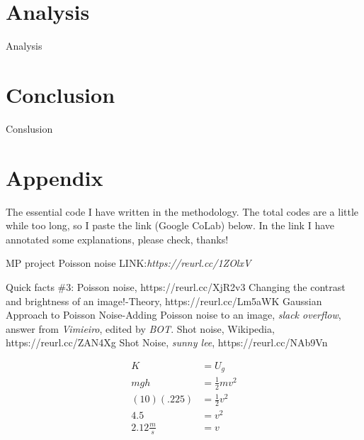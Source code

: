\documentclass[12 pt]{article}
\begin{document}


\section{Analysis}

Analysis

\section{Conclusion}

Conslusion

\section*{Appendix}
The essential code I have written in the methodology. The total codes are a little while too long, so I paste the link (Google CoLab) below. In the link I have annotated some explanations, please check, thanks!

\noindent MP project Poisson noise LINK:\@ \emph{https://reurl.cc/1ZOlxV}
    

\begin{thebibliography}{0}

	
     Quick facts \#3: Poisson noise, https://reurl.cc/XjR2v3
     Changing the contrast and brightness of an image!-Theory, https://reurl.cc/Lm5aWK
     Gaussian Approach to Poisson Noise-Adding Poisson noise to an image, \emph{slack overflow}, answer from \emph{Vimieiro}, edited by \emph{BOT}.
     Shot noise, Wikipedia, https://reurl.cc/ZAN4Xg
     Shot Noise, \emph{sunny lee}, https://reurl.cc/NAb9Vn 
        
    
\end{thebibliography}

\begin{align} 
  K &= U_g \\
  mgh &=\frac{1}{2}mv^2 \\
  (10)(.225) &=\frac{1}{2}v^2 \nonumber \\
  4.5 &=v^2 \nonumber \\
  2.12 \frac{m}{s} &=v 
\end{align}
\end{document}
